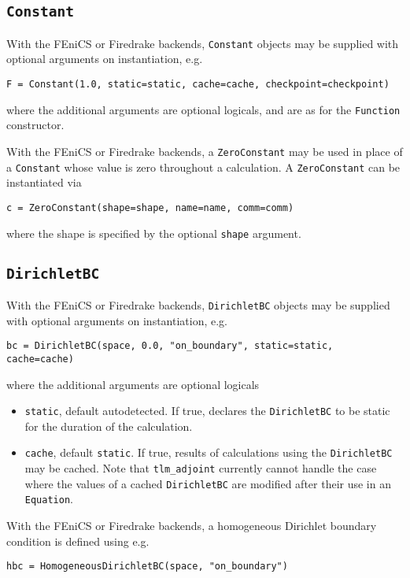 \documentclass[11pt]{article}
\begin{document}
\subsection{\texttt{Constant}}

With the FEniCS or Firedrake backends, \texttt{Constant} objects may be
supplied with optional arguments on instantiation, e.g.
\begin{lstlisting}
F = Constant(1.0, static=static, cache=cache, checkpoint=checkpoint)
\end{lstlisting}
where the additional arguments are optional logicals, and are as for the
\texttt{Function} constructor.

With the FEniCS or Firedrake backends, a \texttt{ZeroConstant} may be used in
place of a \texttt{Constant} whose value is zero throughout a calculation. A
\texttt{ZeroConstant} can be instantiated via
\begin{lstlisting}
c = ZeroConstant(shape=shape, name=name, comm=comm)
\end{lstlisting}
where the shape is specified by the optional \texttt{shape} argument.

\subsection{\texttt{DirichletBC}}

With the FEniCS or Firedrake backends, \texttt{DirichletBC} objects may be
supplied with optional arguments on instantiation, e.g.
\begin{lstlisting}
bc = DirichletBC(space, 0.0, "on_boundary", static=static, cache=cache)
\end{lstlisting}
where the additional arguments are optional logicals
\begin{itemize}
  \item \texttt{static}, default autodetected. If true, declares the
    \texttt{DirichletBC} to be static for the duration of the calculation.
  \item \texttt{cache}, default \texttt{static}. If true, results of
    calculations using the \texttt{DirichletBC} may be cached. Note that
    \texttt{tlm\_adjoint} currently cannot handle the case where the values of
    a cached \texttt{DirichletBC} are modified after their use in an
    \texttt{Equation}.
\end{itemize}

With the FEniCS or Firedrake backends, a homogeneous Dirichlet boundary
condition is defined using e.g.
\begin{lstlisting}
hbc = HomogeneousDirichletBC(space, "on_boundary")
\end{lstlisting}
\end{document}
